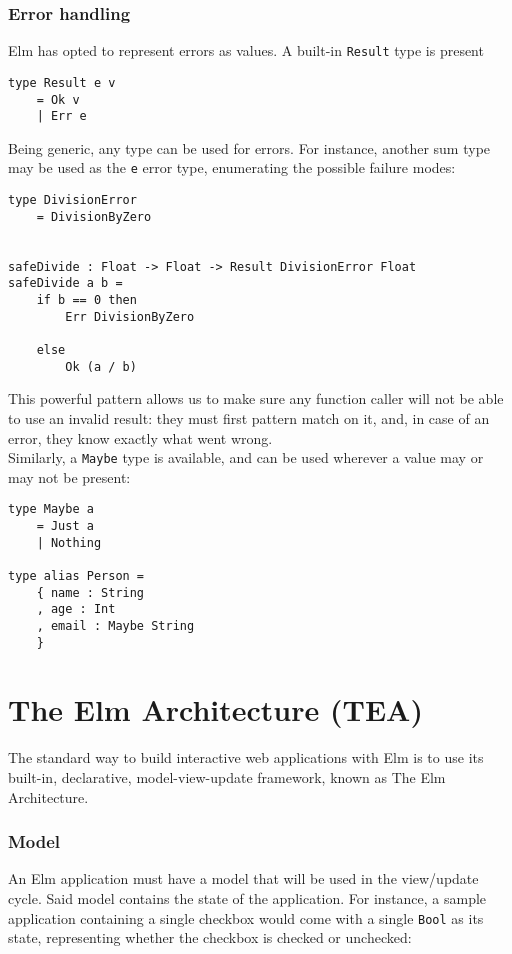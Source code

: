 \subsubsection{Error handling}
Elm has opted to represent errors as values. A built-in \texttt{Result} type is present
\begin{verbatim}
type Result e v
    = Ok v
    | Err e
\end{verbatim}

Being generic, any type can be used for errors. For instance, another sum type may be used as the \texttt{e} error type, enumerating the possible failure modes:
\begin{verbatim}
type DivisionError
    = DivisionByZero


safeDivide : Float -> Float -> Result DivisionError Float
safeDivide a b =
    if b == 0 then
        Err DivisionByZero

    else
        Ok (a / b)
\end{verbatim}
This powerful pattern allows us to make sure any function caller will not be able to use an invalid result: they must first pattern match on it, and, in case of an error, they know exactly what went wrong.\\

Similarly, a \texttt{Maybe} type is available, and can be used wherever a value may or may not be present:
\begin{verbatim}
type Maybe a
    = Just a
    | Nothing

type alias Person =
    { name : String
    , age : Int
    , email : Maybe String
    }
\end{verbatim}

\section{The Elm Architecture (TEA)}

The standard way to build interactive web applications with Elm is to use its built-in, declarative, model-view-update framework, known as The Elm Architecture.

\subsubsection{Model}
An Elm application must have a model that will be used in the view/update cycle. Said model contains the state of the application. For instance, a sample application containing a single checkbox would come with a single \texttt{Bool} as its state, representing whether the checkbox is checked or unchecked:


